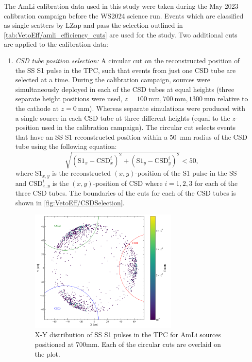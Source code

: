 The AmLi calibration data used in this study were taken during the May 2023 calibration campaign before the WS2024 science run. Events which are classified as single scatters by LZap and pass the selection outlined in \autoref{tab:VetoEff/amli_efficiency_cuts} are used for the study. Two additional cuts are applied to the calibration data:
\begin{enumerate}
	\item \textit{CSD tube position selection:} A circular cut on the reconstructed position of the SS S1 pulse in the TPC, such that events from just one CSD tube are selected at a time. During the calibration campaign, sources were simultaneously deployed in each of the CSD tubes at equal heights (three separate height positions were used, $z=100~\text{mm},700~\text{mm},1300~\text{mm}$ relative to the cathode at $z=0~\text{mm}$). Whereas separate simulations were produced with a single source in each CSD tube at three different heights (equal to the $z$-position used in the calibration campaign).
    The circular cut selects events that have an SS S1 reconstructed position within a 50~mm radius of the CSD tube using the following equation:
    \begin{equation}\label{eqn:VetoEff/CSDSelection}
        \sqrt{(\text{S1}_x-\text{CSD}_x^i)^2+(\text{S1}_y-\text{CSD}_y^i)^2}<50,
    \end{equation}
    where S1$_{x,y}$ is the reconstructed $(x,y)$-position of the S1 pulse in the SS and $\text{CSD}_{x,y}^i$ is the $(x,y)$-position of CSD where $i=1,2,3$ for each of the three CSD tubes.
    The boundaries of the cuts for each of the CSD tubes is shown in \autoref{fig:VetoEff/CSDSelection}. 
    \begin{figure}[!ht]
    \centering
        \includegraphics[width=0.7\textwidth]{figures/VetoEfficiency/CircularCSDCut.pdf}
        \caption[X-Y distribution of SS S1 pulses in the TPC for AmLi sources positioned at 700mm.]{X-Y distribution of SS S1 pulses in the TPC for AmLi sources positioned at 700mm. Each of the circular cuts are overlaid on the plot.}
        \label{fig:VetoEff/CSDSelection}
    \end{figure}
    

\end{enumerate}
